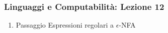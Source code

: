 




\begin{frame}[fragile]
	\frametitle{Linguaggi e Computabilità: Lezione 12}
\begin{enumerate}
\item
Passaggio Espressioni regolari a $\epsilon$-NFA
\end{enumerate}
\end{frame}




